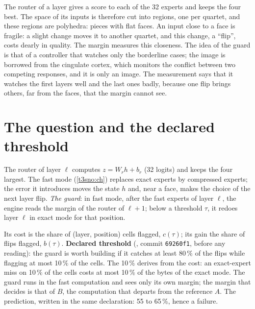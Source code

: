 \begin{enbref}
The router of a layer gives a score to each of the 32 experts and keeps the four best. The space of its inputs is therefore cut into regions, one per quartet, and these regions are polyhedra: pieces with flat faces. An input close to a face is fragile: a slight change moves it to another quartet, and this change, a ``flip'', costs dearly in quality. The margin measures this closeness. The idea of the guard is that of a controller that watches only the borderline cases; the image is borrowed from the cingulate cortex, which monitors the conflict between two competing responses, and it is only an image. The measurement says that it watches the first layers well and the last ones badly, because one flip brings others, far from the faces, that the margin cannot see.
\end{enbref}

\section{The question and the declared threshold}\label{t3tro:sec:question}

The router of layer $\ell$ computes $z = W_r h + b_r$ (32 logits) and keeps the four largest. The fast mode (\cref{t3sno:ch}) replaces exact experts by compressed experts; the error it introduces moves the state $h$ and, near a face, makes the choice of the next layer flip. \emph{The guard}: in fast mode, after the fast experts of layer $\ell$, the engine reads the margin of the router of $\ell + 1$; below a threshold $\tau$, it redoes layer $\ell$ in exact mode for that position.

Its cost is the share of (layer, position) cells flagged, $c(\tau)$; its gain the share of flips flagged, $b(\tau)$. \textbf{Declared threshold} (, commit \texttt{69260f1}, before any reading): the guard is worth building if it catches at least 80\,\% of the flips while flagging at most 10\,\% of the cells. The 10\,\% derives from the cost: an exact-expert miss on 10\,\% of the cells costs at most 10\,\% of the bytes of the exact mode. The guard runs in the fast computation and sees only its own margin; the margin that decides is that of $B$, the computation that departs from the reference $A$. The prediction, written in the same declaration: 55 to 65\,\%, hence a failure.

